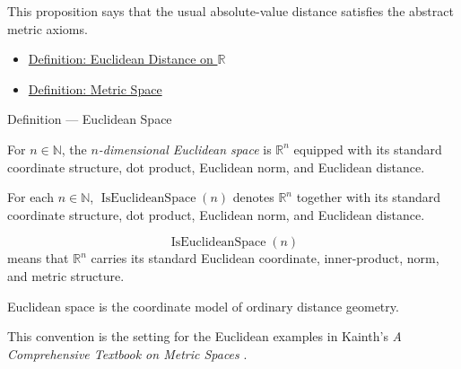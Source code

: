 \begin{remark*}[Interpretation]
This proposition says that the usual absolute-value distance satisfies the
abstract metric axioms.
\end{remark*}


\begin{dependencies}
\begin{itemize}
  \item \hyperref[def:real-line-euclidean-distance]{Definition: Euclidean Distance on \(\mathbb{R}\)}
  \item \hyperref[def:metric-space]{Definition: Metric Space}
\end{itemize}
\end{dependencies}

\begin{definitionbox}{Definition --- Euclidean Space}
\begin{definition}\label{def:euclidean-space}
For \(n\in\mathbb{N}\), the \emph{\(n\)-dimensional Euclidean space} is
\(\mathbb{R}^n\) equipped with its standard coordinate structure, dot product,
Euclidean norm, and Euclidean distance.
\end{definition}
\end{definitionbox}

\begin{remark*}
For each \(n\in\mathbb{N}\), \(\operatorname{IsEuclideanSpace}(n)\) denotes
\(\mathbb{R}^n\) together with its standard coordinate structure, dot product,
Euclidean norm, and Euclidean distance.
\end{remark*}

\begin{remark*}
\[
\operatorname{IsEuclideanSpace}(n)
\]
means that \(\mathbb{R}^n\) carries its standard Euclidean coordinate,
inner-product, norm, and metric structure.
\end{remark*}

\begin{remark*}[Interpretation]
Euclidean space is the coordinate model of ordinary distance geometry.
\end{remark*}

\begin{remark*}
This convention is the setting for the Euclidean examples in Kainth's
\emph{A Comprehensive Textbook on Metric Spaces}
\cite{KainthComprehensiveMetricSpaces2023}.
\end{remark*}

